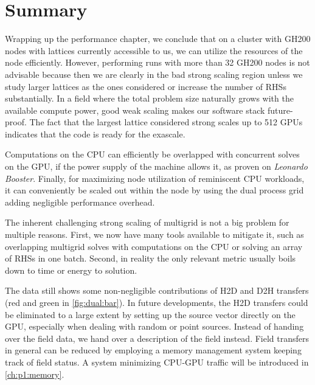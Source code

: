 \section{Summary}
\label{sec:perf:summary}

Wrapping up the performance chapter, we conclude that on a cluster with GH200 nodes with lattices currently accessible to us, we can utilize the resources of the node efficiently.
However, performing runs with more than \num{32} GH200 nodes is not advisable because then we are clearly in the bad strong scaling region unless we study larger lattices as the ones considered or increase the number of RHSs substantially.
In a field where the total problem size naturally grows with the available compute power, good weak scaling makes our software stack future-proof.
The fact that the largest lattice considered strong scales up to \num{512} GPUs indicates that the code is ready for the exascale.


Computations on the CPU can efficiently be overlapped with concurrent solves on the GPU, if the power supply of the machine allows it, as proven on \emph{Leonardo Booster}.
Finally, for maximizing node utilization of reminiscent CPU workloads, it can conveniently be scaled out within the node by using the dual process grid adding negligible performance overhead.

The inherent challenging strong scaling of multigrid is not a big problem for multiple reasons.
First, we now have many tools available to mitigate it, such as overlapping multigrid solves with computations on the CPU or solving an array of RHSs in one batch.
Second, in reality the only relevant metric usually boils down to time or energy to solution.


The data still shows some non-negligible contributions of H2D and D2H transfers (red and green in \cref{fig:dual:bar}).
In future developments, the H2D transfers could be eliminated to a large extent by setting up the source vector directly on the GPU, especially when dealing with random or point sources.
Instead of handing over the field data, we hand over a description of the field instead.
Field transfers in general can be reduced by employing a memory management system keeping track of field status.
A system minimizing CPU-GPU traffic will be introduced in \cref{ch:p1:memory}.

